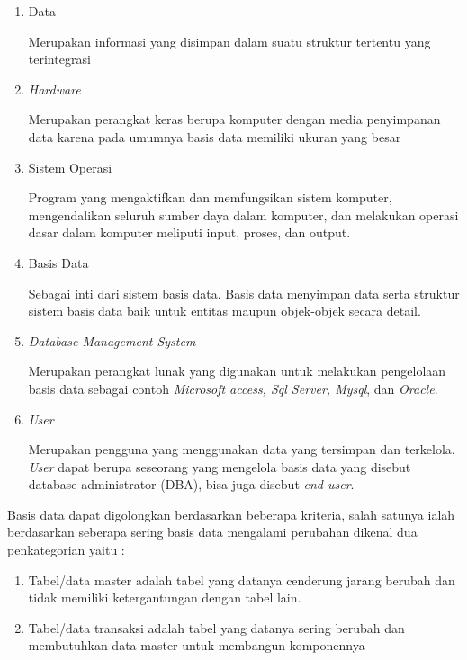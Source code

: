 \begin{enumerate}
	\item Data
	
	Merupakan informasi yang disimpan dalam suatu struktur tertentu yang terintegrasi
	\item \textit{Hardware}
	
	Merupakan perangkat keras berupa komputer dengan media penyimpanan data karena pada umumnya basis data memiliki ukuran yang besar
	\item Sistem Operasi
	
	Program yang mengaktifkan dan memfungsikan sistem komputer, mengendalikan seluruh sumber daya dalam komputer, dan melakukan operasi dasar dalam komputer meliputi input, proses, dan output. 
	\item Basis Data
	
	Sebagai inti dari sistem basis data. Basis data menyimpan data serta struktur sistem basis data baik untuk entitas maupun objek-objek secara detail.
	\item \textit{Database Management System}
	
	Merupakan perangkat lunak yang digunakan untuk melakukan pengelolaan basis data sebagai contoh \textit{Microsoft access, Sql Server, Mysql}, dan \textit{Oracle}. 
	\item \textit{User}
	
	Merupakan pengguna yang menggunakan data yang tersimpan dan terkelola. \textit{User} dapat berupa seseorang yang mengelola basis data yang disebut database administrator (DBA), bisa juga disebut \textit{end user}. 
\end{enumerate}

Basis data dapat digolongkan berdasarkan beberapa kriteria, salah satunya ialah berdasarkan seberapa sering basis data mengalami perubahan dikenal dua penkategorian yaitu \cite{Sulianta} :

\begin{enumerate}
	\item Tabel/data master adalah tabel yang datanya cenderung jarang berubah dan tidak memiliki ketergantungan dengan tabel lain.
	\item Tabel/data transaksi adalah tabel yang datanya sering berubah dan membutuhkan data master untuk membangun komponennya 
\end{enumerate}

		

